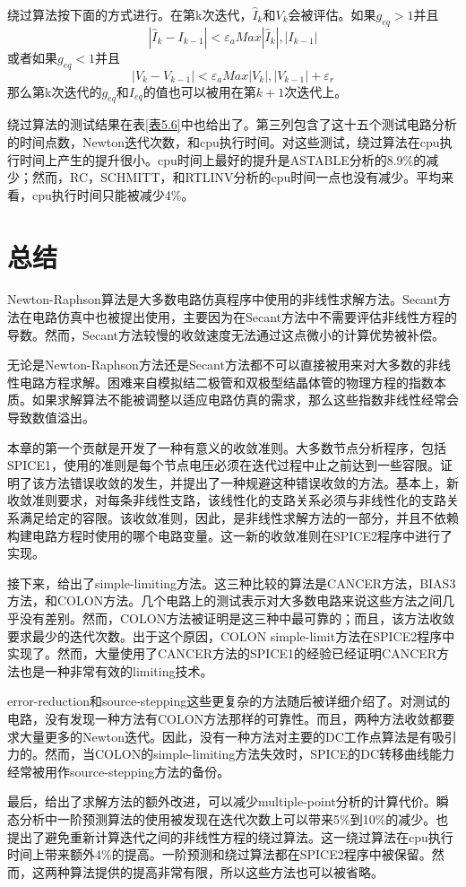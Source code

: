 绕过算法按下面的方式进行。在第k次迭代，$\hat{I}_k$和$V_k$会被评估。如果$g_{eq} > 1$并且
\begin{equation}
    |\hat{I}_k - I_{k-1}| < \varepsilon_a Max{|\hat{I}_k|,|I_{k-1}|}
    \label{eq:5.31}
\end{equation}
或者如果$g_{eq} < 1$并且
\begin{equation}
    |V_k - V_{k-1}| < \varepsilon_a Max{|V_k|,|V_{k-1}|} + \varepsilon_r
    \label{eq:5.32}
\end{equation}
那么第k次迭代的$g_{eq}$和$I_{eq}$的值也可以被用在第$k+1$次迭代上。

绕过算法的测试结果在表\ref{表5.6}中也给出了。第三列包含了这十五个测试电路分析的时间点数，Newton迭代次数，和cpu执行时间。对这些测试，绕过算法在cpu执行时间上产生的提升很小。cpu时间上最好的提升是ASTABLE分析的8.9\%的减少；然而，RC，SCHMITT，和RTLINV分析的cpu时间一点也没有减少。平均来看，cpu执行时间只能被减少4\%。

\section{总结}
Newton-Raphson算法是大多数电路仿真程序中使用的非线性求解方法。Secant方法在电路仿真中也被提出使用，主要因为在Secant方法中不需要评估非线性方程的导数。然而，Secant方法较慢的收敛速度无法通过这点微小的计算优势被补偿。

无论是Newton-Raphson方法还是Secant方法都不可以直接被用来对大多数的非线性电路方程求解。困难来自模拟结二极管和双极型结晶体管的物理方程的指数本质。如果求解算法不能被调整以适应电路仿真的需求，那么这些指数非线性经常会导致数值溢出。

本章的第一个贡献是开发了一种有意义的收敛准则。大多数节点分析程序，包括SPICE1，使用的准则是每个节点电压必须在迭代过程中止之前达到一些容限。证明了该方法错误收敛的发生，并提出了一种规避这种错误收敛的方法。基本上，新收敛准则要求，对每条非线性支路，该线性化的支路关系必须与非线性化的支路关系满足给定的容限。该收敛准则，因此，是非线性求解方法的一部分，并且不依赖构建电路方程时使用的哪个电路变量。这一新的收敛准则在SPICE2程序中进行了实现。

接下来，给出了simple-limiting方法。这三种比较的算法是CANCER方法，BIAS3方法，和COLON方法。几个电路上的测试表示对大多数电路来说这些方法之间几乎没有差别。然而，COLON方法被证明是这三种中最可靠的；而且，该方法收敛要求最少的迭代次数。出于这个原因，COLON simple-limit方法在SPICE2程序中实现了。然而，大量使用了CANCER方法的SPICE1的经验已经证明CANCER方法也是一种非常有效的limiting技术。

error-reduction和source-stepping这些更复杂的方法随后被详细介绍了。对测试的电路，没有发现一种方法有COLON方法那样的可靠性。而且，两种方法收敛都要求大量更多的Newton迭代。因此，没有一种方法对主要的DC工作点算法是有吸引力的。然而，当COLON的simple-limiting方法失效时，SPICE的DC转移曲线能力经常被用作source-stepping方法的备份。

最后，给出了求解方法的额外改进，可以减少multiple-point分析的计算代价。瞬态分析中一阶预测算法的使用被发现在迭代次数上可以带来5\%到10\%的减少。也提出了避免重新计算迭代之间的非线性方程的绕过算法。这一绕过算法在cpu执行时间上带来额外4\%的提高。一阶预测和绕过算法都在SPICE2程序中被保留。然而，这两种算法提供的提高非常有限，所以这些方法也可以被省略。